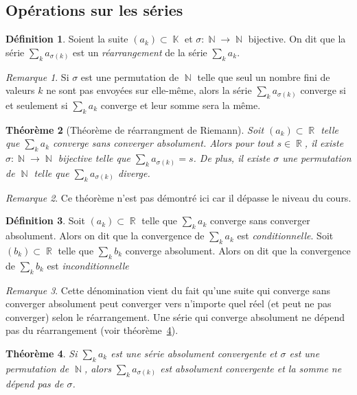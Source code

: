 \documentclass{article}
\DeclareMathOperator{\K}{\mathbb K}
\DeclareMathOperator{\N}{\mathbb N}
\DeclareMathOperator{\R}{\mathbb R}
\newtheorem{thm}{Théorème}[section]
\theoremstyle{definition}
\newtheorem{déf}[thm]{Définition}
\theoremstyle{remark}
\newtheorem*{rmq}{Remarque}
\begin{document}
	\subsection{Opérations sur les séries}
		\begin{déf} Soient la suite $(a_k) \subset \K$ et $\sigma : \N \to \N$ bijective. On dit que la série $\sum_k a_{\sigma(k)}$ est un \emph{réarrangement}
		de la série $\sum_k a_k$.
		\end{déf}

		\begin{rmq} Si $\sigma$ est une permutation de $\N$ telle que seul un nombre fini de valeurs $k$ ne sont pas envoyées sur elle-même, alors la série
		$\sum_k a_{\sigma(k)}$ converge si et seulement si $\sum_k a_k$ converge et leur somme sera la même.
		\end{rmq}

		\begin{thm}[Théorème de réarrangment de Riemann] Soit $(a_k) \subset \R$ telle que $\sum_k a_k$ converge sans converger absolument. Alors pour tout
		$s \in \R$, il existe $\sigma : \N \to \N$ bijective telle que $\sum_k a_{\sigma(k)} = s$. De plus, il existe $\sigma$ une permutation de $\N$ telle que
		$\sum_k a_{\sigma(k)}$ diverge.
		\end{thm}

		\begin{rmq} Ce théorème n'est pas démontré ici car il dépasse le niveau du cours. \end{rmq}

		\begin{déf} Soit $(a_k) \subset \R$ telle que $\sum_k a_k$ converge sans converger absolument. Alors on dit que la convergence de $\sum_k a_k$ est
		\emph{conditionnelle}. Soit $(b_k) \subset \R$ telle que $\sum_k b_k$ converge absolument. Alors on dit que la convergence de $\sum_k b_k$ est
		\emph{inconditionnelle}
		\end{déf}

		\begin{rmq} Cette dénomination vient du fait qu'une suite qui converge sans converger absolument peut converger vers n'importe quel réel (et peut ne pas
		converger) selon le réarrangement. Une série qui converge absolument ne dépend pas du réarrangement (voir théorème~\ref{thm:convabsolurearrangement}).
		\end{rmq}

		\begin{thm}\label{thm:convabsolurearrangement} Si $\sum_k a_k$ est une série absolument convergente et $\sigma$ est une permutation de $\N$, alors
		$\sum_k a_{\sigma(k)}$ est absolument convergente et la somme ne dépend pas de $\sigma$.
		\end{thm}
\end{document}
